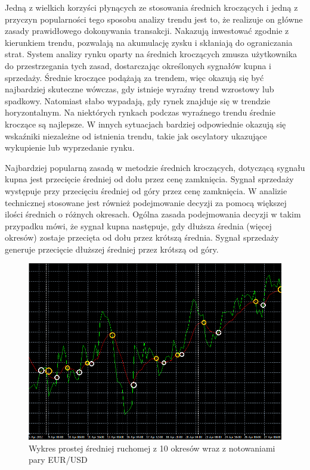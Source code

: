 \documentclass[pdflatex,11pt]{aghdpl}
\begin{document}
Jedną z wielkich korzyści płynących ze stosowania średnich kroczących i jedną z przyczyn popularności tego sposobu analizy trendu jest to, że realizuje on główne zasady prawidłowego dokonywania transakcji. Nakazują inwestować zgodnie z kierunkiem trendu, pozwalają na akumulację zysku i skłaniają do ograniczania strat. System analizy rynku oparty na średnich kroczących zmusza użytkownika do przestrzegania tych zasad, dostarczając określonych sygnałów kupna i sprzedaży. Średnie kroczące podążają za trendem, więc okazują się być najbardziej skuteczne wówczas, gdy istnieje wyraźny trend wzrostowy lub spadkowy. Natomiast słabo wypadają, gdy rynek znajduje się w trendzie horyzontalnym. Na niektórych rynkach podczas wyraźnego trendu średnie kroczące są najlepsze. W innych sytuacjach bardziej odpowiednie okazują się wskaźniki niezależne od istnienia trendu, takie jak oscylatory ukazujące wykupienie lub wyprzedanie rynku.
 
Najbardziej popularną zasadą w metodzie średnich kroczących, dotyczącą sygnału kupna jest przecięcie średniej od dołu przez cenę zamknięcia. Sygnał sprzedaży występuje przy przecięciu średniej od góry przez cenę zamknięcia. W analizie technicznej stosowane jest również podejmowanie decyzji za pomocą większej ilości średnich o różnych okresach. Ogólna zasada podejmowania decyzji w takim przypadku mówi, że sygnał kupna następuje, gdy dłuższa średnia (więcej okresów) zostaje przecięta od dołu przez krótszą średnia\cite{1}. Sygnał sprzedaży generuje przecięcie dłuższej średniej przez krótszą od góry.
\begin{figure}[ht]
\begin{center}
\includegraphics[width=15cm]{ma.png}
\caption{Wykres prostej średniej ruchomej z 10 okresów wraz z notowaniami pary EUR/USD}
\label{ma}
\end{center}
\end{figure}
\end{document}
